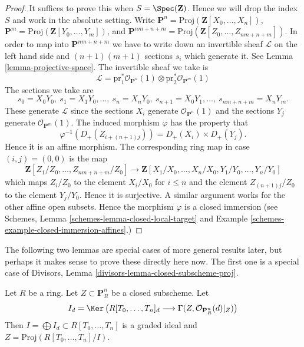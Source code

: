 \begin{proof}
It suffices to prove this when $S = \Spec(\mathbf{Z})$.
Hence we will drop the index $S$ and work in the absolute setting.
Write $\mathbf{P}^n = \text{Proj}(\mathbf{Z}[X_0, \ldots, X_n])$,
$\mathbf{P}^m = \text{Proj}(\mathbf{Z}[Y_0, \ldots, Y_m])$,
and
$\mathbf{P}^{nm + n + m} =
\text{Proj}(\mathbf{Z}[Z_0, \ldots, Z_{nm + n + m}])$.
In order to map into $\mathbf{P}^{nm + n + m}$ we have to
write down an invertible sheaf $\mathcal{L}$ on the left hand
side and $(n + 1)(m + 1)$ sections $s_i$ which generate it.
See Lemma \ref{lemma-projective-space}.
The invertible sheaf we take is
$$
\mathcal{L} =
\text{pr}_1^*\mathcal{O}_{\mathbf{P}^n}(1)
\otimes
\text{pr}_2^*\mathcal{O}_{\mathbf{P}^m}(1)
$$
The sections we take are
$$
s_0 = X_0Y_0, \ s_1 = X_1Y_0, \ldots, \ s_n = X_nY_0,
\ s_{n + 1} = X_0Y_1, \ldots, \ s_{nm + n + m} = X_nY_m.
$$
These generate $\mathcal{L}$ since the sections $X_i$ generate
$\mathcal{O}_{\mathbf{P}^n}(1)$ and the sections $Y_j$ generate
$\mathcal{O}_{\mathbf{P}^m}(1)$. The induced morphism
$\varphi$ has the property that
$$
\varphi^{-1}(D_{+}(Z_{i + (n + 1)j})) = D_{+}(X_i) \times D_{+}(Y_j).
$$
Hence it is an affine morphism. The corresponding ring map in case
$(i, j) = (0, 0)$ is the map
$$
\mathbf{Z}[Z_1/Z_0, \ldots, Z_{nm + n + m}/Z_0]
\longrightarrow
\mathbf{Z}[X_1/X_0, \ldots, X_n/X_0, Y_1/Y_0, \ldots, Y_n/Y_0]
$$
which maps $Z_i/Z_0$ to the element $X_i/X_0$ for $i \leq n$ and
the element $Z_{(n + 1)j}/Z_0$ to the element $Y_j/Y_0$. Hence it
is surjective. A similar argument works for the other affine
open subsets. Hence the morphism $\varphi$ is a closed immersion
(see Schemes, Lemma \ref{schemes-lemma-closed-local-target} and
Example \ref{schemes-example-closed-immersion-affines}.)
\end{proof}

\noindent
The following two lemmas are special cases of more general results later, but
perhaps it makes sense to prove these directly here now. The first one is
a special case of Divisors, Lemma \ref{divisors-lemma-closed-subscheme-proj}.

\begin{lemma}
\label{lemma-closed-in-projective-space}
Let $R$ be a ring. Let $Z \subset \mathbf{P}^n_R$ be a closed subscheme.
Let
$$
I_d = \Ker\left(
R[T_0, \ldots, T_n]_d
\longrightarrow
\Gamma(Z, \mathcal{O}_{\mathbf{P}^n_R}(d)|_Z)\right)
$$
Then $I = \bigoplus I_d \subset R[T_0, \ldots, T_n]$ is
a graded ideal and $Z = \text{Proj}(R[T_0, \ldots, T_n]/I)$.
\end{lemma}

